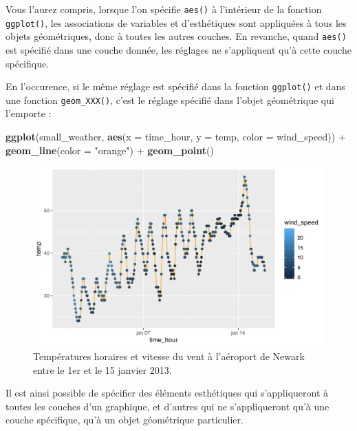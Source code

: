 \documentclass[a4paperpaper,]{article}
\newenvironment{Shaded}{\begin{snugshade}}{\end{snugshade}}
\newcommand{\DataTypeTok}[1]{\textcolor[rgb]{0.00,0.34,0.68}{#1}}
\newcommand{\KeywordTok}[1]{\textcolor[rgb]{0.12,0.11,0.11}{\textbf{#1}}}
\newcommand{\NormalTok}[1]{\textcolor[rgb]{0.12,0.11,0.11}{#1}}
\newcommand{\OperatorTok}[1]{\textcolor[rgb]{0.12,0.11,0.11}{#1}}
\newcommand{\StringTok}[1]{\textcolor[rgb]{0.75,0.01,0.01}{#1}}
\begin{document}
Vous l'aurez compris, lorsque l'on spécifie \texttt{aes()} à l'intérieur de la fonction \texttt{ggplot()}, les associations de variables et d'esthétiques sont appliquées à tous les objets géométriques, donc à toutes les autres couches. En revanche, quand \texttt{aes()} est spécifié dans une couche donnée, les réglages ne s'appliquent qu'à cette couche spécifique.

En l'occurence, si le même réglage est spécifié dans la fonction \texttt{ggplot()} et dans une fonction \texttt{geom\_XXX()}, c'est le réglage spécifié dans l'objet géométrique qui l'emporte :

\begin{Shaded}
\begin{Highlighting}[]
\KeywordTok{ggplot}\NormalTok{(small_weather, }\KeywordTok{aes}\NormalTok{(}\DataTypeTok{x =}\NormalTok{ time_hour, }\DataTypeTok{y =}\NormalTok{ temp, }\DataTypeTok{color =}\NormalTok{ wind_speed)) }\OperatorTok{+}
\StringTok{  }\KeywordTok{geom_line}\NormalTok{(}\DataTypeTok{color =} \StringTok{"orange"}\NormalTok{) }\OperatorTok{+}
\StringTok{  }\KeywordTok{geom_point}\NormalTok{()}
\end{Highlighting}
\end{Shaded}

\begin{figure}[htpb]

{\centering \includegraphics[width=0.9\linewidth]{figure/wind4-1} 

}

\caption{Températures horaires et vitesse du vent à l'aéroport de Newark entre le 1er et le 15 janvier 2013.}\label{fig:wind4}
\end{figure}

Il est ainsi possible de spécifier des éléments esthétiques qui s'appliqueront à toutes les couches d'un graphique, et d'autres qui ne s'appliqueront qu'à une couche spécifique, qu'à un objet géométrique particulier.
\end{document}
